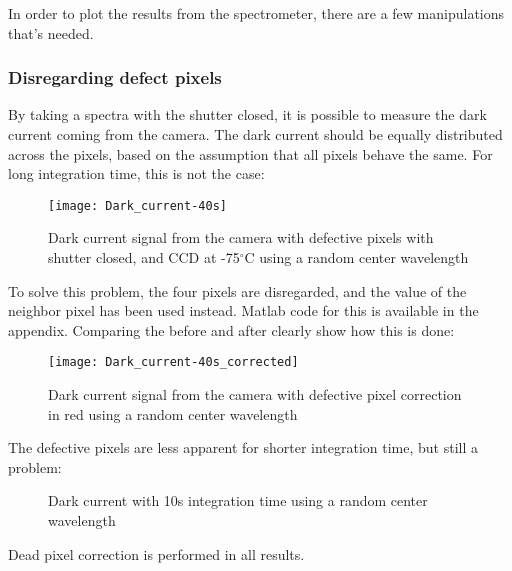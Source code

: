 In order to plot the results from the spectrometer, there are a few manipulations that's needed.

\subsubsection{Disregarding defect pixels}

By taking a spectra with the shutter closed, it is possible to measure the dark current coming from the camera. The dark current should be equally distributed across the pixels, based on the assumption that all pixels behave the same. For long integration time, this is not the case:

\begin{figure}[H]
\centering
\texttt{[image: Dark\_current-40s]}
\caption[Defective pixels]{Dark current signal from the camera with defective pixels with shutter closed, and CCD at -75$^\circ$C using a random center wavelength}%
\label{fig:dark_current_40s}%
\end{figure}

To solve this problem, the four pixels are disregarded, and the value of the neighbor pixel has been used instead. Matlab code for this is available in the appendix. Comparing the before and after clearly show how this is done:

\begin{figure}[H]
\centering
\texttt{[image: Dark\_current-40s\_corrected]}
\caption[Defective pixels corrected]{Dark current signal from the camera with defective pixel correction in red using a random center wavelength}%
\label{fig:dark_current_40s-corrected}%
\end{figure}

The defective pixels are less apparent for shorter integration time, but still a problem:

\begin{figure}[H]
\centering
{}
\label{fig:dark_current_correction_10s-parentfig}
\caption[Dark current with 10s integration time]{Dark current with 10s integration time using a random center wavelength}
\end{figure}

Dead pixel correction is performed in all results.

